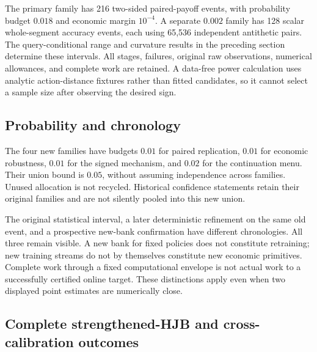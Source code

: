 The primary family has 216 two-sided paired-payoff events, with probability budget $0.018$ and economic margin $10^{-4}$. A separate $0.002$ family has 128 scalar whole-segment accuracy events, each using 65,536 independent antithetic pairs. The query-conditional range and curvature results in the preceding section determine these intervals. All stages, failures, original raw observations, numerical allowances, and complete work are retained. A data-free power calculation uses analytic action-distance fixtures rather than fitted candidates, so it cannot select a sample size after observing the desired sign.

\subsection{Probability and chronology}
The four new families have budgets $0.01$ for paired replication, $0.01$ for economic robustness, $0.01$ for the signed mechanism, and $0.02$ for the continuation menu. Their union bound is $0.05$, without assuming independence across families. Unused allocation is not recycled. Historical confidence statements retain their original families and are not silently pooled into this new union.

The original statistical interval, a later deterministic refinement on the same old event, and a prospective new-bank confirmation have different chronologies. All three remain visible. A new bank for fixed policies does not constitute retraining; new training streams do not by themselves constitute new economic primitives. Complete work through a fixed computational envelope is not actual work to a successfully certified online target. These distinctions apply even when two displayed point estimates are numerically close.

\subsection{Complete strengthened-HJB and cross-calibration outcomes}
\label{app:r16robustrecord}





\begingroup
\small
\setlength{\tabcolsep}{3pt}

\endgroup
